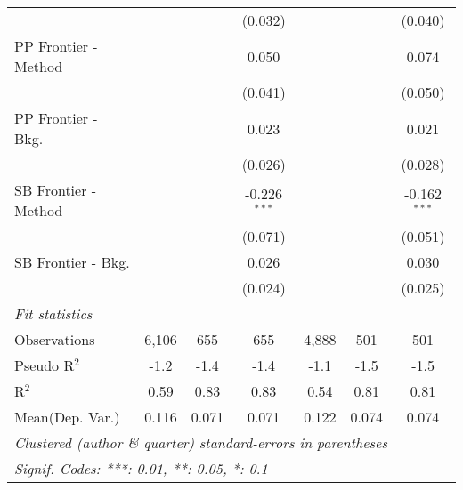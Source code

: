 \begin{tabular}{lcccccc}
                               &         &         & (0.032)        &         &         & (0.040)\\   
   PP Frontier - Method        &         &         & 0.050          &         &         & 0.074\\   
                               &         &         & (0.041)        &         &         & (0.050)\\   
   PP Frontier - Bkg.          &         &         & 0.023          &         &         & 0.021\\   
                               &         &         & (0.026)        &         &         & (0.028)\\   
   SB Frontier - Method        &         &         & -0.226$^{***}$ &         &         & -0.162$^{***}$\\   
                               &         &         & (0.071)        &         &         & (0.051)\\   
   SB Frontier - Bkg.          &         &         & 0.026          &         &         & 0.030\\   
                               &         &         & (0.024)        &         &         & (0.025)\\   
   \midrule
   \emph{Fit statistics}\\
   Observations                & 6,106   & 655     & 655            & 4,888   & 501     & 501\\  
   Pseudo R$^2$                & -1.2    & -1.4    & -1.4           & -1.1    & -1.5    & -1.5\\  
   R$^2$                       & 0.59    & 0.83    & 0.83           & 0.54    & 0.81    & 0.81\\  
Mean(Dep. Var.) & 0.116 & 0.071 & 0.071 & 0.122 & 0.074 & 0.074 \\
   \midrule \midrule
   \multicolumn{7}{l}{\emph{Clustered (author \& quarter) standard-errors in parentheses}}\\
   \multicolumn{7}{l}{\emph{Signif. Codes: ***: 0.01, **: 0.05, *: 0.1}}\\
\end{tabular}
\par\endgroup
